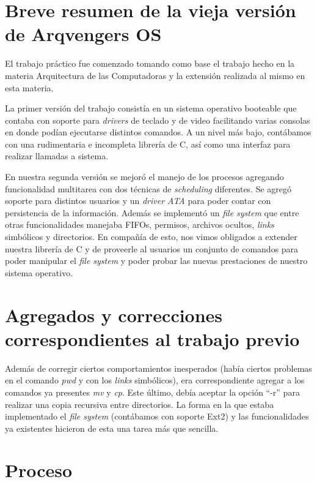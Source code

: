 \documentclass[a4paper,10pt]{article}
\begin{document}
\newpage
\section{Breve resumen de la vieja versión de Arqvengers OS}
El trabajo práctico fue comenzado tomando como base el trabajo hecho en la materia Arquitectura de las Computadoras y la extensión 
realizada al mismo en esta materia.

La primer versión del trabajo consistía en un sistema operativo booteable que contaba con soporte para \textit{drivers} de
 teclado y de video facilitando varias consolas en donde podían ejecutarse distintos comandos. 
A un nivel más bajo, contábamos con una rudimentaria e incompleta librería de C, así como una interfaz para realizar 
llamadas a sistema.

En nuestra segunda versión se mejoró el manejo de los procesos agregando funcionalidad multitarea con dos técnicas de 
\textit{scheduling} diferentes. Se agregó soporte para distintos usuarios y un \textit{driver ATA} para poder contar con persistencia 
de la información. Además se implementó un \textit{file system} que entre otras funcionalidades manejaba FIFOs, permisos, 
archivos ocultos, \textit{links} simbólicos y directorios. En compañía de esto, nos vimos obligados a extender nuestra librería de 
C y de proveerle al usuarios un conjunto de comandos para poder manipular el \textit{file system} y poder probar las nuevas 
prestaciones de nuestro sistema operativo.

\newpage

\section{Agregados y correcciones correspondientes al trabajo previo}

Además de corregir ciertos comportamientos inesperados (había ciertos problemas en el comando \textit{pwd} y con los
\textit{links} simbólicos), era correspondiente agregar a los comandos ya presentes \textit{mv} y \textit{cp}. Este último, 
debía aceptar la opción ``-r'' para realizar una copia recursiva entre directorios. La forma en la que estaba implementado 
el \textit{file system} (contábamos con soporte Ext2) y las funcionalidades ya existentes hicieron de esta una tarea más que sencilla.

\newpage

\section{Proceso}
\end{document}
